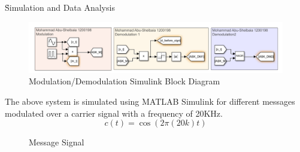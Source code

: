 \documentclass[12pt]{article}
\begin{document}
\tableofcontents
\clearpage
\setlength{\parskip}{\baselineskip}%
\listoffigures
\clearpage
{}
\h{Simulation and Data Analysis}
\begin{figure}[H]
    \centering
    \includegraphics[width=1\textwidth]{assets/main/2023-08-23-18-30-59.png}
    \caption{Modulation/Demodulation Simulink Block Diagram}
\end{figure}
The above system is simulated using MATLAB Simulink for different messages modulated over a carrier signal with a frequency of 20KHz.
\begin{equation}
    c(t) = \cos(2\pi(20k)t)
\end{equation}
\begin{figure}[H]
    \centering
    \caption{Message Signal}
\end{figure}
\end{document}
